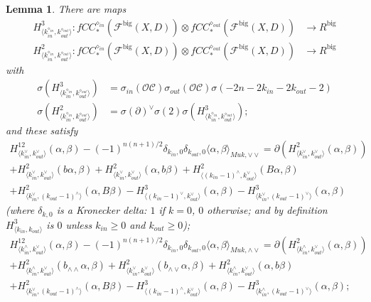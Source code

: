 \documentclass{article}
\newtheorem{lem}{Lemma}[section]
\def\fuk{\EuF}
\def\cO{\mathcal{O}}
\def\cC{\mathcal{C}}
\def\fuk{\mathcal{F}}
\def\big{{\operatorname{big}}}
\def\signn{{n(n+1)/2}}
\begin{document}
\begin{lem} \label{lem:cardy nontriv} 
    There are maps
    \begin{align*}
        H^{3}_{\langle k_{in}^{\diamond_{in}},k_{out}^{\diamond_{out}}\rangle}: fCC^{\diamond_{in}}_*(\fuk^\big(X,D)) \otimes fCC^{\diamond_{out}}_*(\fuk^\big(X,D)) & \to R^\big\\
        H^{2}_{\langle k_{in}^{\diamond_{in}},k_{out}^{\diamond_{out}}\rangle}: fCC^{\diamond_{in}}_*(\fuk^\big(X,D)) \otimes fCC^{\diamond_{out}}_*(\fuk^\big(X,D)) & \to R^\big
    \end{align*}
    with 
    \begin{align}
\label{eq:sigma H3}        \sigma(H^3_{\langle k_{in}^{\diamond_{in}},k_{out}^{\diamond_{out}} \rangle}) & = \sigma_{in}(\cO\cC)\sigma_{out}(\cO\cC)\sigma(-2n-2k_{in}-2k_{out}-2)\\
        \label{eq:sigma H2}\sigma(H^2_{\langle k_{in}^{\diamond_{in}},k_{out}^{\diamond_{out}} \rangle}) &= \sigma(\partial)^\vee \sigma(2)\sigma(H^3_{\langle k_{in}^{\diamond_{in}},k_{out}^{\diamond_{out}} \rangle});
    \end{align}
    and these satisfy
    \begin{multline}\label{eq:H12 vee vee}
        H^{12}_{\langle k^\vee_{in},k^\vee_{out}\rangle}(\alpha,\beta) - (-1)^\signn\delta_{k_{in},0}\delta_{k_{out},0} \langle \alpha,\beta \rangle_{Muk,\vee\vee} = \partial(H^2_{\langle k^\vee_{in},k^\vee_{out}\rangle}(\alpha,\beta)) \\+ H^2_{\langle k^\vee_{in},k^\vee_{out}\rangle}(b\alpha,\beta) + H^2_{\langle k^\vee_{in},k^\vee_{out}\rangle}(\alpha,b\beta) + H^2_{\langle (k_{in}-1)^\wedge,k^\vee_{out}\rangle}(B\alpha,\beta) \\+ H^2_{\langle k^\vee_{in},(k_{out}-1)^\wedge\rangle}(\alpha,B\beta) - H^3_{\langle (k_{in}-1)^\vee,k^\vee_{out}\rangle}(\alpha,\beta) - H^3_{\langle k^\vee_{in},(k_{out}-1)^\vee\rangle}(\alpha,\beta)
    \end{multline}
    (where $\delta_{k,0}$ is a Kronecker delta: $1$ if $k=0$, $0$ otherwise; and by definition $H^3_{\langle k_{in},k_{out}\rangle}$ is $0$ unless $k_{in}\ge 0$ and $k_{out} \ge 0$);
    \begin{multline}
        H^{12}_{\langle k^\wedge_{in},k^\vee_{out}\rangle}(\alpha,\beta) - (-1)^\signn\delta_{k_{in},0}\delta_{k_{out},0} \langle \alpha,\beta \rangle_{Muk,\wedge\vee} = \partial(H^2_{\langle k^\wedge_{in},k^\vee_{out}\rangle}(\alpha,\beta)) \\+ H^2_{\langle k^\wedge_{in},k^\vee_{out}\rangle}(b_{\wedge\wedge}\alpha,\beta) + H^2_{\langle k^\vee_{in},k^\vee_{out}\rangle}(b_{\wedge\vee}\alpha,\beta) + H^2_{\langle k^\wedge_{in},k^\vee_{out}\rangle}(\alpha,b\beta)  \\+ H^2_{\langle k^\vee_{in},(k_{out}-1)^\wedge\rangle}(\alpha,B\beta) - H^3_{\langle (k_{in}-1)^\wedge,k_{out}^\vee\rangle}(\alpha,\beta) - H^3_{\langle k_{in}^\wedge,(k_{out}-1)^\vee\rangle}(\alpha,\beta);

\end{multline}
\end{lem}
\end{document}

